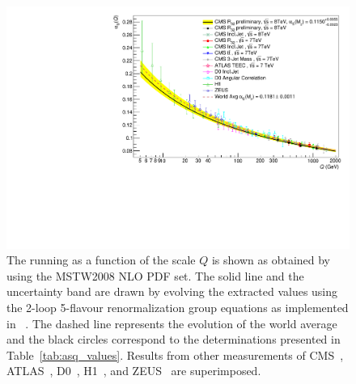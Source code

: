 %

\begin{figure}[tbp]
 \hspace*{-4mm}\includegraphics[width=1.05\textwidth]{Plots_HT_2_150/Running_alphas_8TeV_R32.pdf}
 \caption{The running \alpsq as a function of the scale $Q$ is shown as obtained by using the MSTW2008 NLO PDF set. The solid line and the uncertainty band are drawn by evolving the extracted \alpsmz values using the 2-loop 5-flavour renormalization group equations as implemented in \RunDec~\cite{Chetyrkin:2000yt,Schmidt:2012az}. The dashed line represents the evolution of the world average~\cite{Patrignani:2016xqp} and the black circles correspond to the \alpsq determinations presented in Table~\ref{tab:asq_values}. Results from other measurements of CMS~\cite{Chatrchyan:2013txa, Chatrchyan:2013haa, Khachatryan:2014waa, CMS:2014mna, Khachatryan:2016mlc}, ATLAS~\cite{ATLAS:2015yaa}, D0~\cite{Abazov:2009nc, Abazov:2012lua}, H1~\cite{Andreev:2014wwa, Andreev:2016tgi}, and ZEUS~\cite{Abramowicz:2012jz} are superimposed.}
 \label{fig:running_alphas}
\end{figure}
